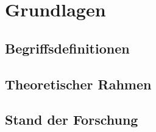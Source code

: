 \chapter{Grundlagen}\label{chap:grundlagen}

\section{Begriffsdefinitionen}\label{sec:begriffe}

\section{Theoretischer Rahmen}\label{sec:theorie}

\section{Stand der Forschung}\label{sec:forschung}
